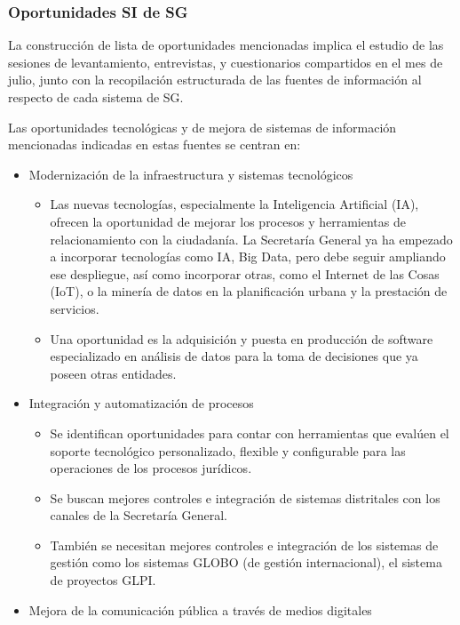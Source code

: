 \documentclass[
	a4paper, %
	12pt, %
]{include/CSSullivanBusinessReport}
\def\tightlist{}
\begin{document}
\subsubsection{Oportunidades SI de SG}\label{sec:oportunidades-si-de-sg}

La construcción de lista de oportunidades mencionadas implica el estudio
de las sesiones de levantamiento, entrevistas, y cuestionarios
compartidos en el mes de julio, junto con la recopilación estructurada
de las fuentes de información al respecto de cada sistema de SG.

Las oportunidades tecnológicas y de mejora de sistemas de información
mencionadas indicadas en estas fuentes se centran en:

\begin{itemize}
\tightlist
\item
  Modernización de la infraestructura y sistemas tecnológicos

  \begin{itemize}
  \tightlist
  \item
    Las nuevas tecnologías, especialmente la Inteligencia Artificial
    (IA), ofrecen la oportunidad de mejorar los procesos y herramientas
    de relacionamiento con la ciudadanía. La Secretaría General ya ha
    empezado a incorporar tecnologías como IA, Big Data, pero debe
    seguir ampliando ese despliegue, así como incorporar otras, como el
    Internet de las Cosas (IoT), o la minería de datos en la
    planificación urbana y la prestación de servicios.
  \item
    Una oportunidad es la adquisición y puesta en producción de software
    especializado en análisis de datos para la toma de decisiones que ya
    poseen otras entidades.
  \end{itemize}
\item
  Integración y automatización de procesos

  \begin{itemize}
  \tightlist
  \item
    Se identifican oportunidades para contar con herramientas que
    evalúen el soporte tecnológico personalizado, flexible y
    configurable para las operaciones de los procesos jurídicos.
  \item
    Se buscan mejores controles e integración de sistemas distritales
    con los canales de la Secretaría General.
  \item
    También se necesitan mejores controles e integración de los sistemas
    de gestión como los sistemas GLOBO (de gestión internacional), el
    sistema de proyectos GLPI.
  \end{itemize}
\item
  Mejora de la comunicación pública a través de medios digitales


\end{itemize}
\end{document}
